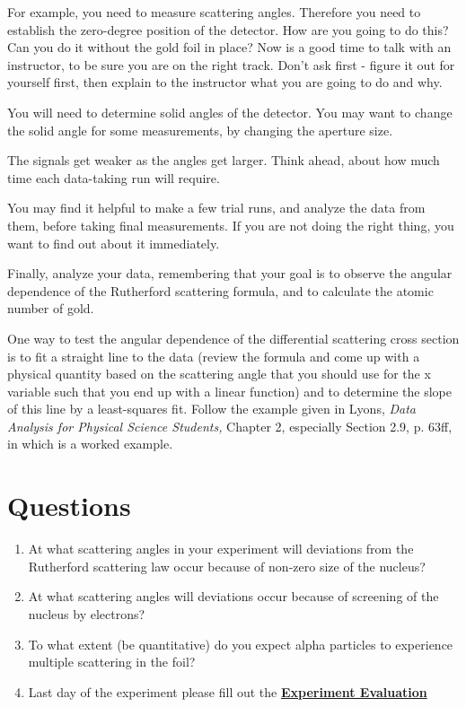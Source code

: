 \documentclass{../lab}
\begin{document}
For example, you need to measure scattering angles. Therefore you need to establish the zero-degree position of the detector. How are you going to do this? Can you do it without the gold foil in place? Now is a good time to talk with an instructor, to be sure you are on the right track. Don't ask first - figure it out for yourself first, then explain to the instructor what you are going to do and why.

You will need to determine solid angles of the detector. You may want to change the solid angle for some measurements, by changing the aperture size.

The signals get weaker as the angles get larger. Think ahead, about how much time each data-taking run will require.

You may find it helpful to make a few trial runs, and analyze the data from them, before taking final measurements. If you are not doing the right thing, you want to find out about it immediately.

Finally, analyze your data, remembering that your goal is to observe the angular dependence of the Rutherford scattering formula, and to calculate the atomic number of gold.

One way to test the angular dependence of the differential scattering cross section is to fit a straight line to the data (review the formula and come up with a physical quantity based on the scattering angle that you should use for the x variable such that you end up with a linear function) and to determine the slope of this line by a least-squares fit. Follow the example given in Lyons, \emph{Data Analysis for Physical Science Students, }Chapter 2, especially Section 2.9, p. 63ff, in which is a worked example.

\section{Questions}

\begin{enumerate}
    \item At what scattering angles in your experiment will deviations from the Rutherford scattering law occur because of non-zero size of the nucleus?

    \item At what scattering angles will deviations occur because of screening of the nucleus by electrons?

    \item To what extent (be quantitative) do you expect alpha particles to experience multiple scattering in the foil?

    \item Last day of the experiment please fill out the \href{\ExperimentEvaluation}{\textbf{Experiment Evaluation}}

\end{enumerate}
\end{document}
